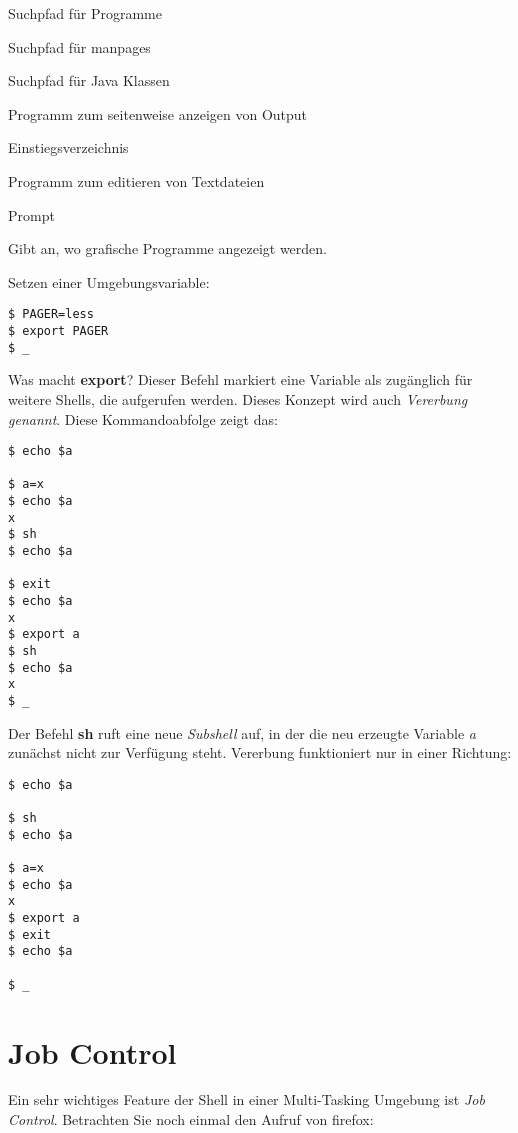 \documentclass[titlepage,a4paper]{article}
\begin{document}
\begin{description}
\setlength{\itemsep}{0pt}
\item[PATH] Suchpfad für Programme
\item[MANPATH] Suchpfad für manpages
\item[CLASSPATH] Suchpfad für Java Klassen
\item[PAGER] Programm zum seitenweise anzeigen von Output
\item[HOME] Einstiegsverzeichnis
\item[EDITOR] Programm zum editieren von Textdateien
\item[PS1] Prompt
\item[DISPLAY] Gibt an, wo grafische Programme angezeigt werden.
\end{description}

Setzen einer Umgebungsvariable: 

\begin{verbatim}
$ PAGER=less
$ export PAGER
$ _
\end{verbatim}

Was macht \textbf{export}?  Dieser Befehl markiert eine Variable als
zugänglich für weitere Shells, die aufgerufen werden.  Dieses Konzept wird
auch \emph{Vererbung genannt}.  Diese Kommandoabfolge zeigt das:

\begin{verbatim}
$ echo $a

$ a=x
$ echo $a
x
$ sh
$ echo $a

$ exit
$ echo $a
x
$ export a
$ sh
$ echo $a
x 
$ _
\end{verbatim}

Der Befehl \textbf{sh} ruft eine neue \emph{Subshell} auf, in der die neu
erzeugte Variable \emph{a} zunächst nicht zur Verfügung steht.  Vererbung
funktioniert nur in einer Richtung:

\begin{verbatim}
$ echo $a

$ sh
$ echo $a

$ a=x
$ echo $a
x
$ export a
$ exit
$ echo $a

$ _
\end{verbatim}

\section{Job Control}
\label{sec:jobcontrol}

Ein sehr wichtiges Feature der Shell in einer Multi-Tasking Umgebung ist
\emph{Job Control}.  Betrachten Sie noch einmal den Aufruf von firefox:
\end{document}
